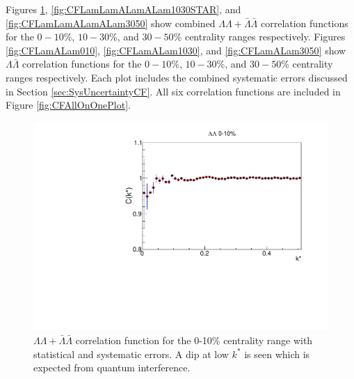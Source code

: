 Figures \ref{fig:CFLamLamALamALam010}, \ref{fig:CFLamLamALamALam1030STAR}, and \ref{fig:CFLamLamALamALam3050} show combined $\Lambda\Lambda + \bar{\Lambda}\bar{\Lambda}$ correlation functions for the $0-10$\%, $10-30$\%, and $30-50$\% centrality ranges respectively.  
Figures \ref{fig:CFLamALam010}, \ref{fig:CFLamALam1030}, and \ref{fig:CFLamALam3050} show $\Lambda\bar{\Lambda}$ correlation functions for the $0-10$\%, $10-30$\%, and $30-50$\% centrality ranges respectively.  
Each plot includes the combined systematic errors discussed in Section \ref{sec:SysUncertaintyCF}.
All six correlation functions are included in Figure \ref{fig:CFAllOnOnePlot}.

\begin{figure}[hbt]
\includegraphics[width=36pc]{Figures/CFs/2016-8-30-CFLLAA010CombinedSystematicsMaximum.pdf}
\caption[$\Lambda\Lambda + \bar{\Lambda}\bar{\Lambda}$ correlation function for the 0-10\% centrality range]{$\Lambda\Lambda + \bar{\Lambda}\bar{\Lambda}$ correlation function for the 0-10\% centrality range with statistical and systematic errors.  
A dip at low $k^*$ is seen which is expected from quantum interference.}
\label{fig:CFLamLamALamALam010}
\end{figure}

